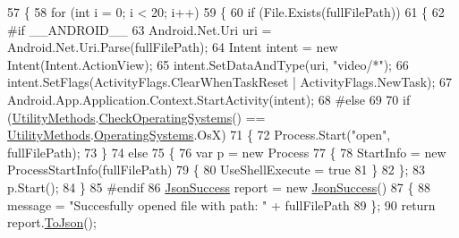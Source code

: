 \begin{DoxyCode}
57             \{                
58                 \textcolor{keywordflow}{for} (\textcolor{keywordtype}{int} i = 0; i < 20; i++)
59                 \{
60                     \textcolor{keywordflow}{if} (File.Exists(fullFilePath))
61                     \{
62 \textcolor{preprocessor}{#if \_\_ANDROID\_\_}
63                         Android.Net.Uri uri = Android.Net.Uri.Parse(fullFilePath);
64                         Intent intent = \textcolor{keyword}{new} Intent(Intent.ActionView);
65                         intent.SetDataAndType(uri, \textcolor{stringliteral}{"video/*"});
66                         intent.SetFlags(ActivityFlags.ClearWhenTaskReset | ActivityFlags.NewTask);
67                         Android.App.Application.Context.StartActivity(intent);
68 \textcolor{preprocessor}{#else}
69 
70                         \textcolor{keywordflow}{if} (\mbox{\hyperlink{class_little_weeb_library_1_1_static_classes_1_1_utility_methods}{UtilityMethods}}.\mbox{\hyperlink{class_little_weeb_library_1_1_static_classes_1_1_utility_methods_afc8c716f32bc35d59afdb287be06c3ca}{CheckOperatingSystems}}() == 
      \mbox{\hyperlink{class_little_weeb_library_1_1_static_classes_1_1_utility_methods}{UtilityMethods}}.\mbox{\hyperlink{class_little_weeb_library_1_1_static_classes_1_1_utility_methods_aad4a2807f22b8cb65b8db3cdc981a0b1}{OperatingSystems}}.OsX)
71                         \{
72                             Process.Start(\textcolor{stringliteral}{"open"}, fullFilePath);
73                         \}
74                         \textcolor{keywordflow}{else}
75                         \{
76                             var p = \textcolor{keyword}{new} Process
77                             \{
78                                 StartInfo = \textcolor{keyword}{new} ProcessStartInfo(fullFilePath)
79                                 \{
80                                     UseShellExecute = \textcolor{keyword}{true}
81                                 \}
82                             \};
83                             p.Start();
84                         \}                       
85 \textcolor{preprocessor}{#endif}
86                         \mbox{\hyperlink{class_little_weeb_library_1_1_models_1_1_json_success}{JsonSuccess}} report = \textcolor{keyword}{new} \mbox{\hyperlink{class_little_weeb_library_1_1_models_1_1_json_success}{JsonSuccess}}()
87                         \{
88                             message = \textcolor{stringliteral}{"Succesfully opened file with path: "} + fullFilePath
89                         \};
90                         \textcolor{keywordflow}{return} report.\mbox{\hyperlink{class_little_weeb_library_1_1_models_1_1_json_success_a407103dc37a77aaf47a782296bab7518}{ToJson}}();

\end{DoxyCode}
